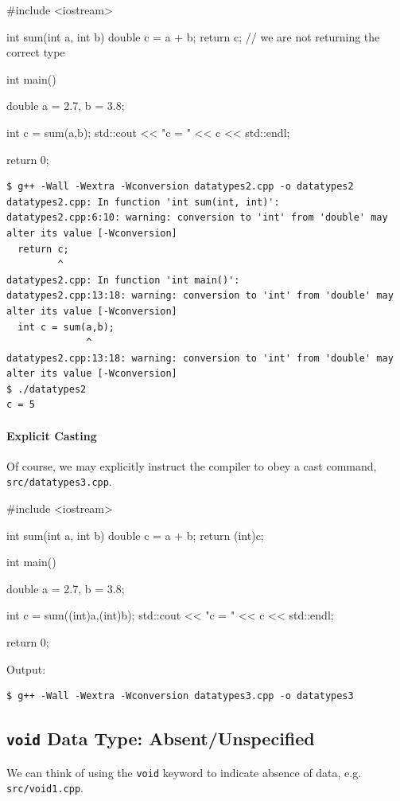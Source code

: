 \documentclass[12pt,letterpaper,twoside]{article}
\begin{document}
\begin{cpp}
#include <iostream>

int sum(int a, int b) {
  double c = a + b;
  return c; // we are not returning the correct type
}

int main() {
  double a = 2.7, b = 3.8;

  int c = sum(a,b);
  std::cout << "c = " << c << std::endl;

  return 0;
}
\end{cpp}

{\small
\begin{verbatim}
$ g++ -Wall -Wextra -Wconversion datatypes2.cpp -o datatypes2
datatypes2.cpp: In function 'int sum(int, int)':
datatypes2.cpp:6:10: warning: conversion to 'int' from 'double' may alter its value [-Wconversion]
  return c;
         ^
datatypes2.cpp: In function 'int main()':
datatypes2.cpp:13:18: warning: conversion to 'int' from 'double' may alter its value [-Wconversion]
  int c = sum(a,b);
              ^
datatypes2.cpp:13:18: warning: conversion to 'int' from 'double' may alter its value [-Wconversion]
$ ./datatypes2
c = 5
\end{verbatim}
}

\paragraph{Explicit Casting} Of course, we may explicitly instruct the compiler to obey
a cast command,
\texttt{src/datatypes3.cpp}.

\begin{cpp}
#include <iostream>

int sum(int a, int b) {
  double c = a + b;
  return (int)c;
}

int main() {
  double a = 2.7, b = 3.8;

  int c = sum((int)a,(int)b);
  std::cout << "c = " << c << std::endl;

  return 0;
}
\end{cpp}

Output:

\begin{verbatim}
$ g++ -Wall -Wextra -Wconversion datatypes3.cpp -o datatypes3
\end{verbatim}

\subsection{\texttt{void} Data Type: Absent/Unspecified}
We can think of using the \texttt{void} keyword to indicate absence of data, e.g.
\texttt{src/void1.cpp}.
\end{document}
